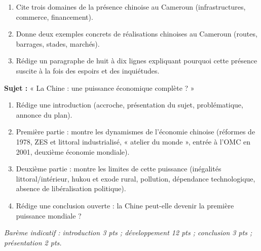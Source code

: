 \documentclass[11pt]{article}
\newcommand{\cle}[1]{{\popxbold\color{popdark}#1}}
\newcounter{popsec}
\newcounter{popsub}
\newcommand{\courssub}[1]{%
  \stepcounter{popsub}%
  \par\vspace{9pt}\noindent{\popxbold\fontsize{11.5}{13}\selectfont\color{popink}{\color{poporange}\thepopsec.\thepopsub}\hspace{6pt}#1}\par\nopagebreak\vspace{4pt}
}
\begin{document}
\begin{exercice}
\begin{enumerate}
\item Cite trois domaines de la présence chinoise au Cameroun (infrastructures, commerce, financement).
\item Donne deux exemples concrets de réalisations chinoises au Cameroun (routes, barrages, stades, marchés).
\item Rédige un paragraphe de huit à dix lignes expliquant pourquoi cette présence suscite à la fois des espoirs et des inquiétudes.
\end{enumerate}
\end{exercice}

\courssub{Je me prépare au Bac}

\begin{exercice}
\textbf{Sujet :} « La Chine : une puissance économique complète ? »
\begin{enumerate}
\item Rédige une introduction (accroche, présentation du sujet, problématique, annonce du plan).
\item Première partie : montre les dynamismes de l'économie chinoise (réformes de 1978, ZES et littoral industrialisé, « atelier du monde », entrée à l'OMC en 2001, deuxième économie mondiale).
\item Deuxième partie : montre les limites de cette puissance (inégalités littoral/intérieur, \cle{hukou} et exode rural, pollution, dépendance technologique, absence de libéralisation politique).
\item Rédige une conclusion ouverte : la Chine peut-elle devenir la première puissance mondiale ?
\end{enumerate}
\emph{Barème indicatif : introduction 3 pts ; développement 12 pts ; conclusion 3 pts ; présentation 2 pts.}
\end{exercice}
\end{document}
